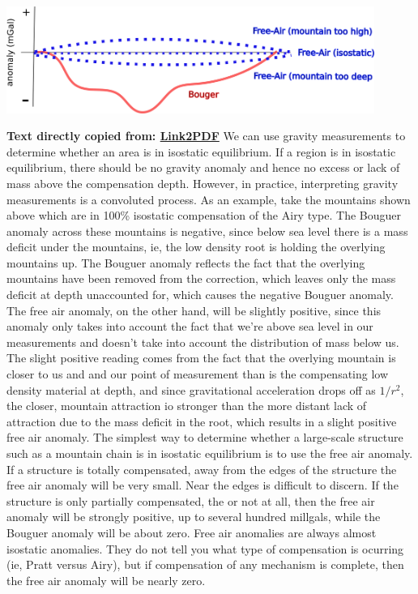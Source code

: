   \begin{tcolorbox}[enhanced jigsaw,breakable,pad at break*=1mm,
    colback=blue!5!white,colframe=babyblueeyes,title=Solutions]
    \begin{center}
    \includegraphics[width=0.9\textwidth]{Figures/Gravimetry/SolutionsProfiles.png}
    \end{center}
    \textbf{Text directly copied from: \href{https://www.geology.cwu.edu/facstaff/tim/TEACHING/Geophysics/gravity_geoid.pdf}{Link2PDF}}
    We can use gravity measurements to determine whether an area is in isostatic equilibrium. If a region is in isostatic equilibrium, there should be no gravity anomaly and hence no excess or lack of mass above the compensation depth. However, in practice, interpreting gravity measurements is a convoluted process. As an example, take the mountains shown above which are in 100\% isostatic compensation of the Airy type. The Bouguer anomaly across these mountains is negative, since below sea level there is a mass deficit under the mountains, ie, the low density root is holding the overlying mountains up. The Bouguer
    anomaly reflects the fact that the overlying mountains have been removed from the correction, which leaves only the mass deficit at depth unaccounted for, which causes the negative Bouguer anomaly. The free air anomaly, on the other hand, will be slightly positive, since this anomaly only takes into account the fact that we’re above sea level in our measurements and doesn’t take into account the distribution of mass below us. The slight positive reading comes from the fact that the overlying mountain is closer to us
    and and our point of measurement than is the compensating low density material at depth, and since gravitational acceleration drops off as $1/r^2$, the closer, mountain attraction io stronger than the more distant lack of attraction due to the mass deficit in the root, which results in a slight positive free air anomaly. The simplest way to determine whether a large-scale structure such as a mountain chain is in isostatic equilibrium is to use the free air anomaly. If a structure is totally compensated, away from the edges of the structure the free air anomaly will be very small. Near the edges is difficult to discern. If the structure is only partially compensated, the or not at all, then the free air anomaly will be strongly positive, up to several hundred millgals, while the Bouguer anomaly will be about zero. Free air anomalies are always almost isostatic anomalies. They do not tell you what type of compensation is ocurring (ie, Pratt versus Airy), but if compensation of any mechanism is complete, then the free air anomaly will be nearly zero.
  \end{tcolorbox}
\fi